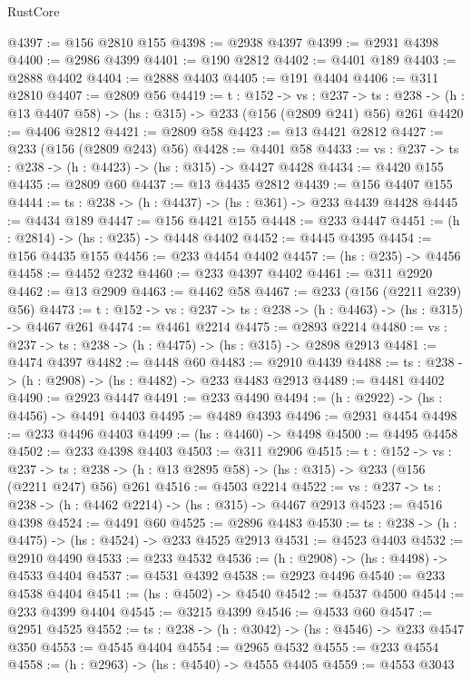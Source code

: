 \begin{lexlean}{RustCore}
\begin{coremodule}
@4397 := @156 @2810 @155
@4398 := @2938 @4397
@4399 := @2931 @4398
@4400 := @2986 @4399
@4401 := @190 @2812
@4402 := @4401 @189
@4403 := @2888 @4402
@4404 := @2888 @4403
@4405 := @191 @4404
@4406 := @311 @2810
@4407 := @2809 @56
@4419 := {t : @152} ->
  {vs : @237} ->
  {ts : @238} -> (h : @13 @4407 @58) -> (hs : @315) -> @233 (@156 (@2809 @241) @56) @261
@4420 := @4406 @2812
@4421 := @2809 @58
@4423 := @13 @4421 @2812
@4427 := @233 (@156 (@2809 @243) @56)
@4428 := @4401 @58
@4433 := {vs : @237} -> {ts : @238} -> (h : @4423) -> (hs : @315) -> @4427 @4428
@4434 := @4420 @155
@4435 := @2809 @60
@4437 := @13 @4435 @2812
@4439 := @156 @4407 @155
@4444 := {ts : @238} -> (h : @4437) -> (hs : @361) -> @233 @4439 @4428
@4445 := @4434 @189
@4447 := @156 @4421 @155
@4448 := @233 @4447
@4451 := (h : @2814) -> (hs : @235) -> @4448 @4402
@4452 := @4445 @4395
@4454 := @156 @4435 @155
@4456 := @233 @4454 @4402
@4457 := (hs : @235) -> @4456
@4458 := @4452 @232
@4460 := @233 @4397 @4402
@4461 := @311 @2920
@4462 := @13 @2909
@4463 := @4462 @58
@4467 := @233 (@156 (@2211 @239) @56)
@4473 := {t : @152} -> {vs : @237} -> {ts : @238} -> (h : @4463) -> (hs : @315) -> @4467 @261
@4474 := @4461 @2214
@4475 := @2893 @2214
@4480 := {vs : @237} -> {ts : @238} -> (h : @4475) -> (hs : @315) -> @2898 @2913
@4481 := @4474 @4397
@4482 := @4448 @60
@4483 := @2910 @4439
@4488 := {ts : @238} -> (h : @2908) -> (hs : @4482) -> @233 @4483 @2913
@4489 := @4481 @4402
@4490 := @2923 @4447
@4491 := @233 @4490
@4494 := (h : @2922) -> (hs : @4456) -> @4491 @4403
@4495 := @4489 @4393
@4496 := @2931 @4454
@4498 := @233 @4496 @4403
@4499 := (hs : @4460) -> @4498
@4500 := @4495 @4458
@4502 := @233 @4398 @4403
@4503 := @311 @2906
@4515 := {t : @152} ->
  {vs : @237} ->
  {ts : @238} -> (h : @13 @2895 @58) -> (hs : @315) -> @233 (@156 (@2211 @247) @56) @261
@4516 := @4503 @2214
@4522 := {vs : @237} -> {ts : @238} -> (h : @4462 @2214) -> (hs : @315) -> @4467 @2913
@4523 := @4516 @4398
@4524 := @4491 @60
@4525 := @2896 @4483
@4530 := {ts : @238} -> (h : @4475) -> (hs : @4524) -> @233 @4525 @2913
@4531 := @4523 @4403
@4532 := @2910 @4490
@4533 := @233 @4532
@4536 := (h : @2908) -> (hs : @4498) -> @4533 @4404
@4537 := @4531 @4392
@4538 := @2923 @4496
@4540 := @233 @4538 @4404
@4541 := (hs : @4502) -> @4540
@4542 := @4537 @4500
@4544 := @233 @4399 @4404
@4545 := @3215 @4399
@4546 := @4533 @60
@4547 := @2951 @4525
@4552 := {ts : @238} -> (h : @3042) -> (hs : @4546) -> @233 @4547 @350
@4553 := @4545 @4404
@4554 := @2965 @4532
@4555 := @233 @4554
@4558 := (h : @2963) -> (hs : @4540) -> @4555 @4405
@4559 := @4553 @3043

\end{coremodule}
\end{lexlean}
